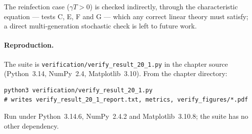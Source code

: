 The reinfection case ($\gamma T>0$) is checked indirectly, through the
characteristic equation --- tests C, E, F and G --- which any correct linear
theory must satisfy; a direct multi-generation stochastic check is left to
future work.

\paragraph{Reproduction.}
The suite is \texttt{verification/verify\_result\_20\_1.py} in the chapter
source (Python~3.14, NumPy~2.4, Matplotlib~3.10). From the chapter
directory:
\begin{verbatim}
python3 verification/verify_result_20_1.py
# writes verify_result_20_1_report.txt, metrics, verify_figures/*.pdf
\end{verbatim}
\noindent
Run under Python~3.14.6, NumPy~2.4.2 and Matplotlib~3.10.8; the suite has no
other dependency.

\FloatBarrier
